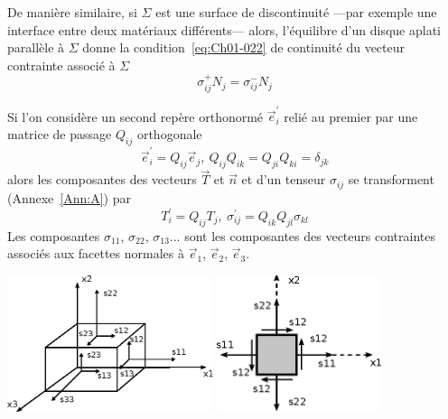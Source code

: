 De manière similaire, si $\Sigma$ est une surface de discontinuité ---par exemple une interface entre deux matériaux différents--- alors, l'équilibre d'un disque aplati parallèle à $\Sigma$ donne la condition~\eqref{eq:Ch01-022} de continuité du vecteur contrainte associé à $\Sigma$
\begin{equation}
    \sigma_{ij}^+ N_j = \sigma_{ij}^- N_j
    \label{eq:Ch02-005}
\end{equation}

Si l'on considère un second repère orthonormé $\vec{e}_i^{\prime}$ relié au premier par une matrice de passage $Q_{ij}$ orthogonale
\begin{equation}
    \vec{e}_i^{\prime} = Q_{ij} \vec{e}_j,\ Q_{ij}Q_{ik} = Q_{ji}Q_{ki} = \delta_{jk}
    \label{eq:Ch02-006}
\end{equation}
alors les composantes des vecteurs $\vec{T}$ et $\vec{n}$ et d'un tenseur $\sigma_{ij}$ se transforment (Annexe~\ref{Ann:A}) par
\begin{equation}
    T_i^{\prime} = Q_{ij} T_j,\ \sigma_{ij}^{\prime} = Q_{ik}Q_{jl} \sigma_{kl}
    \label{eq:Ch02-007}
\end{equation}
Les composantes $\sigma_{11}$, $\sigma_{22}$, $\sigma_{13}$...  sont les composantes des vecteurs contraintes associés aux facettes normales à $\vec{e}_1$, $\vec{e}_2$, $\vec{e}_3$.
    \begin{center}
        \includegraphics[height=4cm]{../images/T1_Ch02-0004}
\qquad
        \includegraphics[height=4cm]{../images/T1_Ch02-0005}
    \end{center}
